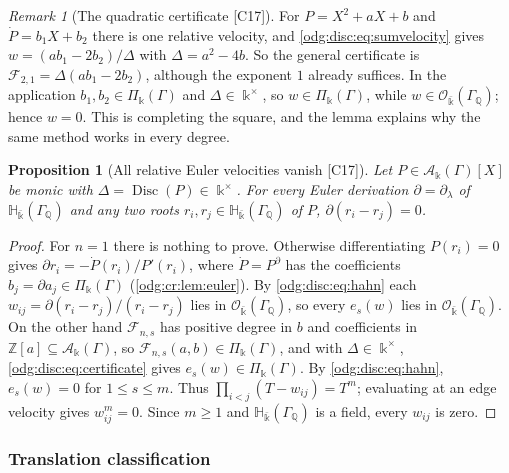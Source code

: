 \documentclass[11pt,oneside]{article}
\numberwithin{equation}{section}
\newtheorem{proposition}[proposition]{Proposition}
\theoremstyle{definition}
\theoremstyle{remark}
\newtheorem{remark}[remark]{Remark}
\newcommand{\Z}{\mathbb Z}
\newcommand{\Q}{\mathbb Q}
\newcommand{\src}[1]{\textup{\textsf{\small[#1]}}}
\newcommand{\crA}{\mathcal A_\Bbbk(\Gamma)}
\newcommand{\crP}{\Pi_\Bbbk(\Gamma)}
\newcommand{\Disc}{\operatorname{Disc}}
\newcommand{\Hbar}{\mathbb H_{\bar\Bbbk}(\Gamma_\Q)}
\newcommand{\Obar}{\mathcal O_{\bar\Bbbk}(\Gamma_\Q)}
\begin{document}
\begin{remark}[The quadratic certificate \src{C17}]\label{odg:disc:rem:quadratic}
For $P=X^2+aX+b$ and $\dot P=b_1X+b_2$ there is one relative velocity, and
\eqref{odg:disc:eq:sumvelocity} gives $w=(ab_1-2b_2)/\Delta$ with $\Delta=a^2-4b$.
So the general certificate is $\mathcal F_{2,1}=\Delta(ab_1-2b_2)$, although the
exponent $1$ already suffices. In the application $b_1,b_2\in\crP$ and
$\Delta\in\Bbbk^\times$, so $w\in\crP$, while $w\in\Obar$; hence $w=0$. This is completing
the square, and the lemma explains why the same method works in every degree.
\end{remark}

\begin{proposition}[All relative Euler velocities vanish \src{C17}]\label{odg:disc:prop:velocities}
Let $P\in\crA[X]$ be monic with $\Delta=\Disc(P)\in\Bbbk^\times$. For every Euler
derivation $\partial=\partial_\lambda$ of $\Hbar$ and any two roots $r_i,r_j\in\Hbar$ of
$P$, $\partial(r_i-r_j)=0$.
\end{proposition}
\begin{proof}
For $n=1$ there is nothing to prove. Otherwise differentiating $P(r_i)=0$ gives
$\partial r_i=-\dot P(r_i)/P'(r_i)$, where $\dot P=P^{\partial}$ has the coefficients
$b_j=\partial a_j\in\crP$ (\cref{odg:cr:lem:euler}). By \eqref{odg:disc:eq:hahn} each
$w_{ij}=\partial(r_i-r_j)/(r_i-r_j)$ lies in $\Obar$, so every $e_s(w)$ lies in $\Obar$.
On the other hand $\mathcal F_{n,s}$ has positive degree in $b$ and coefficients in
$\Z[a]\subseteq\crA$, so $\mathcal F_{n,s}(a,b)\in\crP$, and with $\Delta\in\Bbbk^\times$,
\eqref{odg:disc:eq:certificate} gives $e_s(w)\in\crP$. By \eqref{odg:disc:eq:hahn},
$e_s(w)=0$ for $1\le s\le m$. Thus $\prod_{i<j}(T-w_{ij})=T^m$; evaluating at an edge
velocity gives $w_{ij}^m=0$. Since $m\ge1$ and $\Hbar$ is a field, every $w_{ij}$ is zero.
\end{proof}

\subsubsection{Translation classification}\label{odg:disc:sub:translation}
\end{document}
